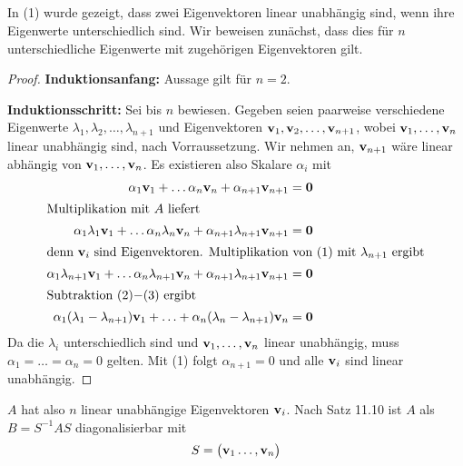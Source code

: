 \documentclass{../mfa}
\begin{document}
\subsection{}

In (1) wurde gezeigt, dass zwei Eigenvektoren linear unabhängig sind, wenn ihre
Eigenwerte unterschiedlich sind. Wir beweisen zunächst, dass dies für $n$
unterschiedliche Eigenwerte mit zugehörigen Eigenvektoren gilt.

\begin{proof}

\textbf{Induktionsanfang:} Aussage gilt für $n=2$.

\textbf{Induktionsschritt:} Sei bis $n$ bewiesen. Gegeben seien paarweise
verschiedene Eigenwerte $\lambda_1, \lambda_2, \ldots, \lambda_{n+1}$ und
Eigenvektoren $\v{1}, \v{2}, \ldots, \v{n+1}$, wobei $\v{1}, \ldots, \v{n}$
linear unabhängig sind, nach Vorraussetzung. Wir nehmen an, $\v{n+1}$ wäre
linear abhängig von $\v{1}, \ldots, \v{n}$. Es existieren also Skalare
$\alpha_i$ mit 
\setcounter{equation}{0}
\begin{align}
   \alpha_1 \v{1} + \ldots \alpha_n \v{n} + \alpha_{n+1} \v{n+1} &= \mbf{0} \\
   \intertext{Multiplikation mit $A$ liefert}
   \alpha_1 \lambda_1 \v{1} + \ldots \alpha_n \lambda_n \v{n} + \alpha_{n+1} \lambda_{n+1} \v{n+1} &= \mbf{0} \\
   \intertext{denn $\v{i}$ sind Eigenvektoren. Multiplikation von (1) mit
   $\lambda_{n+1}$ ergibt}
   \alpha_1 \lambda_{n+1} \v{1} + \ldots \alpha_n \lambda_{n+1} \v{n} + \alpha_{n+1} \lambda_{n+1} \v{n+1} &= \mbf{0} \\
   \intertext{Subtraktion (2)$-$(3) ergibt}
   \alpha_1(\lambda_1 - \lambda_{n+1})\v{1} + \ldots + \alpha_n (\lambda_n -
   \lambda_{n+1})\v{n} &= \mbf{0}
\end{align}
Da die $\lambda_i$ unterschiedlich sind und $\v{1}, \ldots, \v{n}$ linear
unabhängig, muss $\alpha_1 = \ldots = \alpha_n = 0$ gelten. Mit (1) folgt
$\alpha_{n+1} = 0$ und alle $\v{i}$ sind linear unabhängig. 
\end{proof}

$A$ hat also $n$ linear unabhängige
Eigenvektoren $\mathbf{v}_i$. Nach Satz 11.10 ist $A$ als $B=S^{-1} A S$ diagonalisierbar mit
\begin{equation*}
   S = \begin{pmatrix}
      \mathbf{v}_1 \ldots, \mathbf{v}_n
   \end{pmatrix}
\end{equation*}

   
\end{document}
